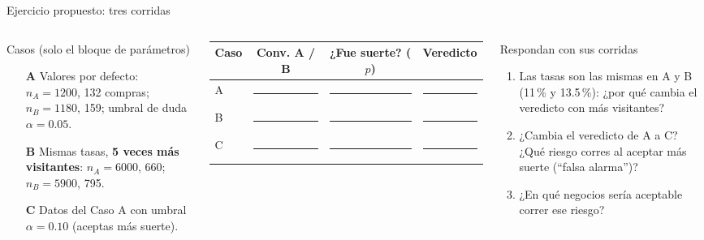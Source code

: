 \documentclass[aspectratio=169,xcolor=dvipsnames]{beamer}
\begin{document}
\begin{frame}{Ejercicio propuesto: tres corridas}
\begin{columns}[T]
  \begin{exampleblock}{Casos (solo el bloque de parámetros)}
    \scriptsize
    \begin{itemize}
      \item[\textbf{A}] Valores por defecto: $n_A=1200$, 132 compras; $n_B=1180$, 159; umbral de duda $\alpha=0.05$.
      \item[\textbf{B}] Mismas tasas, \textbf{5 veces más visitantes}: $n_A=6000$, 660; $n_B=5900$, 795.
      \item[\textbf{C}] Datos del Caso A con umbral $\alpha=0.10$ (aceptas más suerte).
    \end{itemize}
  \end{exampleblock}
  \footnotesize
  \begin{tabular}{@{}lccc@{}}
    \toprule
    Caso & Conv. A / B & ¿Fue suerte? ($p$) & Veredicto \\
    \midrule
    A & \rule{0.9cm}{0.4pt} & \rule{0.9cm}{0.4pt} & \rule{1.1cm}{0.4pt} \\[2pt]
    B & \rule{0.9cm}{0.4pt} & \rule{0.9cm}{0.4pt} & \rule{1.1cm}{0.4pt} \\[2pt]
    C & \rule{0.9cm}{0.4pt} & \rule{0.9cm}{0.4pt} & \rule{1.1cm}{0.4pt} \\
    \bottomrule
  \end{tabular}
  \vspace{2pt}
  \begin{block}{Respondan con sus corridas}
    \scriptsize
    \begin{enumerate}
      \item Las tasas son las mismas en A y B (11\,\% y 13.5\,\%): ¿por qué cambia el veredicto con más visitantes?
      \item ¿Cambia el veredicto de A a C? ¿Qué riesgo corres al aceptar más suerte (\enquote{falsa alarma})?
      \item ¿En qué negocios sería aceptable correr ese riesgo?
    \end{enumerate}
  \end{block}
\end{columns}
\end{frame}
\end{document}
